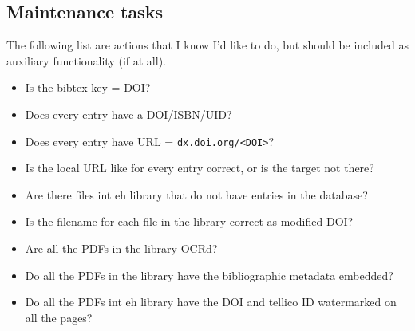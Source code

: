 \documentclass[letterpaper,12pt]{article}
\begin{document}
\subsection{Maintenance tasks}
The following list are actions that I know I'd like to do, but should be included as auxiliary functionality (if at all).

\begin{itemize}
\item Is the bibtex key = DOI?
\item Does every entry have a DOI/ISBN/UID?
\item Does every entry have URL = \verb|dx.doi.org/<DOI>|?
\item Is the local URL like for every entry correct, or is the target not there?
\item Are there files int eh library that do not have entries in the database?
\item Is the filename for each file in the library correct as modified DOI?
\item Are all the PDFs in the library OCRd?
\item Do all the PDFs in the library have the bibliographic metadata embedded?
\item Do all the PDFs int eh library have the DOI and tellico ID watermarked on all the pages?
\end{itemize}
\end{document}
